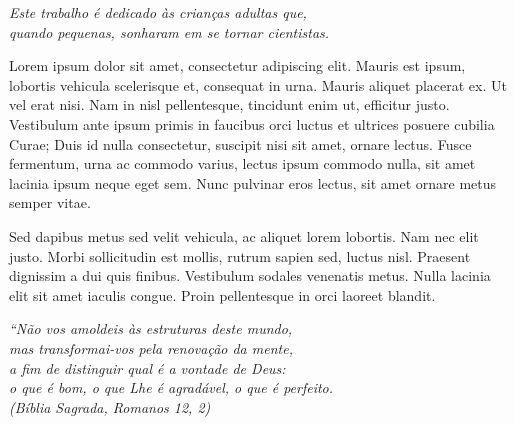 \documentclass[
	12pt,				%
    oneside,			%
	a4paper,			%
	english,			%
	french,				%
	spanish,			%
	brazil				%
	]{abntex2}
\begin{document}

\frenchspacing

\imprimircapa
\imprimirfolhaderosto*

\begin{dedicatoria}
   \vspace*{\fill}
   \centering
   \noindent
   \textit{ Este trabalho é dedicado às crianças adultas que,\\
   quando pequenas, sonharam em se tornar cientistas.} \vspace*{\fill}
\end{dedicatoria}

\begin{agradecimentos}
Lorem ipsum dolor sit amet, consectetur adipiscing elit. Mauris est ipsum, lobortis vehicula scelerisque et, consequat in urna. Mauris aliquet placerat ex. Ut vel erat nisi. Nam in nisl pellentesque, tincidunt enim ut, efficitur justo. Vestibulum ante ipsum primis in faucibus orci luctus et ultrices posuere cubilia Curae; Duis id nulla consectetur, suscipit nisi sit amet, ornare lectus. Fusce fermentum, urna ac commodo varius, lectus ipsum commodo nulla, sit amet lacinia ipsum neque eget sem. Nunc pulvinar eros lectus, sit amet ornare metus semper vitae.

Sed dapibus metus sed velit vehicula, ac aliquet lorem lobortis. Nam nec elit justo. Morbi sollicitudin est mollis, rutrum sapien sed, luctus nisl. Praesent dignissim a dui quis finibus. Vestibulum sodales venenatis metus. Nulla lacinia elit sit amet iaculis congue. Proin pellentesque in orci laoreet blandit.
\end{agradecimentos}

\begin{epigrafe}
    \vspace*{\fill}
	\begin{flushright}
		\textit{``Não vos amoldeis às estruturas deste mundo, \\
		mas transformai-vos pela renovação da mente, \\
		a fim de distinguir qual é a vontade de Deus: \\
		o que é bom, o que Lhe é agradável, o que é perfeito.\\
		(Bíblia Sagrada, Romanos 12, 2)}
	\end{flushright}
\end{epigrafe}
\end{document}
